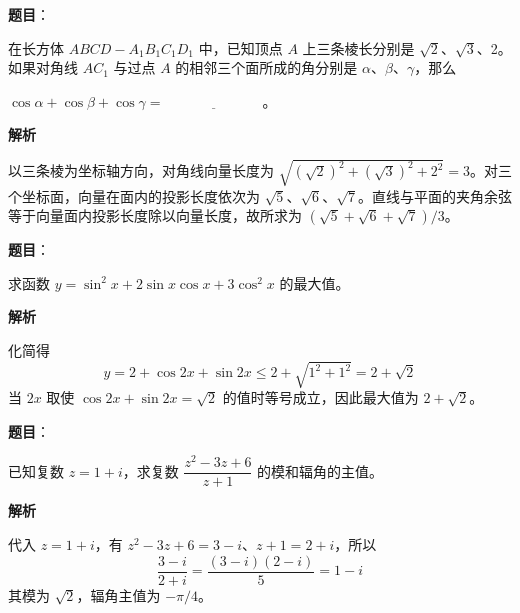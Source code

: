 \begin{answer}

\textbf{题目}：

在长方体 $ABCD-A_1B_1C_1D_1$ 中，已知顶点 $A$ 上三条棱长分别是 $\sqrt2$、$\sqrt3$、2。如果对角线 $AC_1$ 与过点 $A$ 的相邻三个面所成的角分别是 $\alpha$、$\beta$、$\gamma$，那么

$\cos\alpha+\cos\beta+\cos\gamma=\underline{\hspace{7em}}$。

\textbf{解析}

以三条棱为坐标轴方向，对角线向量长度为 $\sqrt{(\sqrt2)^2+(\sqrt3)^2+2^2}=3$。对三个坐标面，向量在面内的投影长度依次为 $\sqrt5$、$\sqrt6$、$\sqrt7$。直线与平面的夹角余弦等于向量面内投影长度除以向量长度，故所求为 $(\sqrt5+\sqrt6+\sqrt7)/3$。


\end{answer}
\begin{answer}

\textbf{题目}：

求函数 $y=\sin^2x+2\sin x\cos x+3\cos^2x$ 的最大值。

\textbf{解析}

化简得
\nopagebreak[4]
\[
y=2+\cos2x+\sin2x\le2+\sqrt{1^2+1^2}=2+\sqrt2
\]
当 $2x$ 取使 $\cos2x+\sin2x=\sqrt2$ 的值时等号成立，因此最大值为 $2+\sqrt2$。


\end{answer}
\begin{answer}

\textbf{题目}：

已知复数 $z=1+i$，求复数 $\dfrac{z^2-3z+6}{z+1}$ 的模和辐角的主值。

\textbf{解析}

代入 $z=1+i$，有 $z^2-3z+6=3-i$、$z+1=2+i$，所以
\nopagebreak[4]
\[
\frac{3-i}{2+i}=\frac{(3-i)(2-i)}5=1-i
\]
其模为 $\sqrt2$，辐角主值为 $-\pi/4$。


\end{answer}
